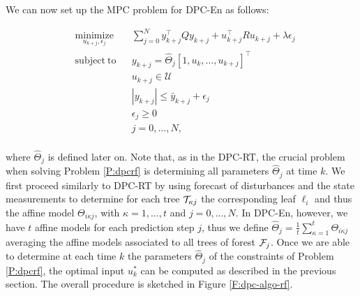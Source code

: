 


\textcolor[rgb]{0,0,1}{We can now set up the MPC problem for DPC-En as follows:}
\begin{problem}\label{P:dpcrf}
	\begin{equation}
		\begin{aligned}
		& \underset{u_{k+j},\epsilon_j}{\mathrm{minimize}} & & \sum_{j=0}^{N} y^\top_{k+j} Q y_{k+j} + u^\top_{k+j} R u_{k+j} + \lambda\epsilon_j \\
		& \mathrm{subject\ to }                 & & y_{k+j}      =  \hat{\Theta}_{j} [1,u_{k},\ldots,u_{k+j} ]^\top                      \\
		&                                       & & u_{k+j}    \in  \mathcal{U}                                                        \\
		&                                       & & |y_{k+j}|  \leq \bar{y}_{k+j} + \epsilon_j 										 \\
		&                                       & & \epsilon_j \geq  0							                                     \\
		&                                       & & j           =    0,\ldots,N,            									         \\
		\end{aligned}
		\label{E:dpcrf}
	\end{equation}
\end{problem}
\noindent \textcolor[rgb]{0,0,1}{where $\hat{\Theta}_{j}$ is defined later on. Note that, as in the DPC-RT, the crucial problem when solving Problem \ref{P:dpcrf} is determining all parameters $\hat{\Theta}_{j}$ at time $k$. We first proceed similarly to DPC-RT by using forecast of disturbances and the state measurements to determine for each tree $\mathcal{T}_{\kappa j}$ the corresponding leaf $\ell_i$ and thus the affine model $\Theta_{i \kappa j}$, with $\kappa = 1,\ldots,t$ and $j = 0,\ldots,N$. In DPC-En, however, we have $t$ affine models for each prediction step $j$, thus we define $\hat{\Theta}_{j} = \frac{1}{t}\sum\limits_{\kappa = 1}^{t} \Theta_{i \kappa j}$ averaging the affine models associated to all trees of forest $\mathcal{F}_j$. Once we are able to determine at each time $k$ the parameters $\hat{\Theta}_{j}$ of the constraints of Problem \ref{P:dpcrf}, the optimal input $u^*_k$ can be computed as described in the previous section. The overall procedure is sketched in Figure \ref{F:dpc-algo-rf}.}

